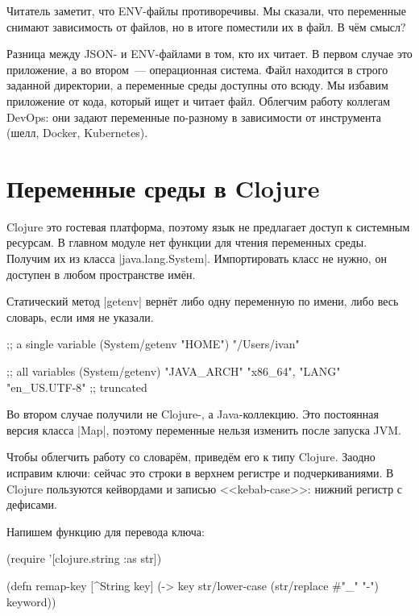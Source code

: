 Читатель заметит, что ENV-файлы противоречивы. Мы сказали, что переменные
снимают зависимость от файлов, но в итоге поместили их в файл. В ч\"{е}м смысл?


Разница между JSON- и ENV-файлами в том, кто их читает. В первом случае это
приложение, а во втором~--- операционная система. Файл находится в строго
заданной директории, а переменные среды доступны ото всюду. Мы избавим
приложение от кода, который ищет и читает файл. Облегчим работу коллегам DevOps:
они задают переменные по-разному в зависимости от инструмента (шелл, Docker,
Kubernetes).

\section{Переменные среды в Clojure}


Clojure это гостевая платформа, поэтому язык не предлагает доступ к системным
ресурсам. В главном модуле нет функции для чтения переменных среды. Получим их
из класса \spverb|java.lang.System|. Импортировать класс не нужно, он доступен в
любом пространстве им\"{е}н.

Статический метод \spverb|getenv| верн\"{е}т либо одну переменную по имени, либо
весь словарь, если имя не указали.

\begin{english}
  \begin{clojure}
;; a single variable
(System/getenv "HOME")
"/Users/ivan"

;; all variables
(System/getenv)
{"JAVA_ARCH" "x86_64", "LANG" "en_US.UTF-8"} ;; truncated
  \end{clojure}
\end{english}

Во втором случае получили не Clojure-, а Java-коллекцию. Это постоянная версия
класса \spverb|Map|, поэтому переменные нельзя изменить после запуска JVM.

Чтобы облегчить работу со словар\"{е}м, приведём его к типу Clojure. Заодно исправим
ключи: сейчас это строки в верхнем регистре и подчеркиваниями. В Clojure
пользуются кейвордами и записью <<kebab-case>>: нижний регистр с дефисами.


Напишем функцию для перевода ключа:

\begin{english}
  \begin{clojure}
(require '[clojure.string :as str])

(defn remap-key [^String key]
  (-> key
      str/lower-case
      (str/replace #"_" "-")
      keyword))
  \end{clojure}
\end{english}

